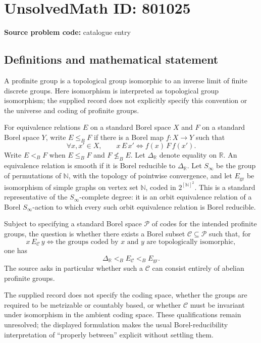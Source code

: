 \documentclass[11pt]{article}
\newcommand{\N}{\mathbb{N}}
\newcommand{\R}{\mathbb{R}}
\begin{document}
\section*{UnsolvedMath ID: 801025}
\textbf{Source problem code:} catalogue entry
\subsection{Definitions and mathematical statement}
A profinite group is a topological group isomorphic to an inverse limit of finite discrete groups. Here isomorphism is interpreted as topological group isomorphism; the supplied record does not explicitly specify this convention or the universe and coding of profinite groups.

For equivalence relations \(E\) on a standard Borel space \(X\) and \(F\) on a standard Borel space \(Y\), write \(E\leq_B F\) if there is a Borel map \(f:X\to Y\) such that
\[
\forall x,x'\in X,\qquad x\,E\,x'\iff f(x)\,F\,f(x').
\]
Write \(E<_B F\) when \(E\leq_B F\) and \(F\not\leq_B E\). Let \(\Delta_{\R}\) denote equality on \(\R\). An equivalence relation is smooth if it is Borel reducible to \(\Delta_{\R}\). Let \(S_\infty\) be the group of permutations of \(\N\), with the topology of pointwise convergence, and let \(E_{\mathrm{gr}}\) be isomorphism of simple graphs on vertex set \(\N\), coded in \(2^{[\N]^2}\). This is a standard representative of the \(S_\infty\)-complete degree: it is an orbit equivalence relation of a Borel \(S_\infty\)-action to which every such orbit equivalence relation is Borel reducible.

Subject to specifying a standard Borel space \(\mathcal P\) of codes for the intended profinite groups, the question is whether there exists a Borel subset \(\mathcal C\subseteq\mathcal P\) such that, for
\[
x\,E_{\mathcal C}\,y\iff\text{the groups coded by }x\text{ and }y\text{ are topologically isomorphic},
\]
one has
\[
\Delta_{\R}<_B E_{\mathcal C}<_B E_{\mathrm{gr}}.
\]
The source asks in particular whether such a \(\mathcal C\) can consist entirely of abelian profinite groups.

The supplied record does not specify the coding space, whether the groups are required to be metrizable or countably based, or whether \(\mathcal C\) must be invariant under isomorphism in the ambient coding space. These qualifications remain unresolved; the displayed formulation makes the usual Borel-reducibility interpretation of ``properly between'' explicit without settling them.
\end{document}
